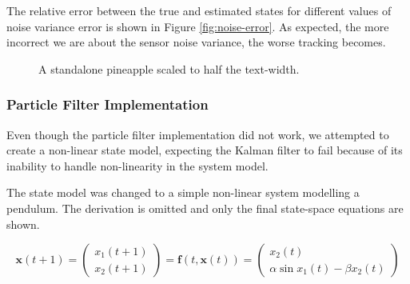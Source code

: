 The relative error between the true and estimated states for different values
of noise variance error is shown in Figure \ref{fig:noise-error}. As expected,
the more incorrect we are about the sensor noise variance, the worse tracking
becomes.

\begin{figure}[h]
\centering
{}
\caption{A standalone pineapple scaled to half the text-width.}
\label{fig:filter}
\end{figure}

\subsubsection{Particle Filter Implementation}
Even though the particle filter implementation did not work, we attempted to
create a non-linear state model, expecting the Kalman filter to fail because
of its inability to handle non-linearity in the system model.

The state model was changed to a simple non-linear system modelling a pendulum.
The derivation is omitted and only the final state-space equations are shown.

\begin{equation}
\mathbf{x}(t+1) =
\begin{pmatrix}
x_{1}(t+1) \\ x_{2}(t+1)
\end{pmatrix}
=
\mathbf{f}(t, \mathbf{x}(t)) =
\begin{pmatrix}
x_{2}(t) \\ \alpha \sin x_{1}(t) - \beta x_{2}(t)
\end{pmatrix}
\end{equation}

